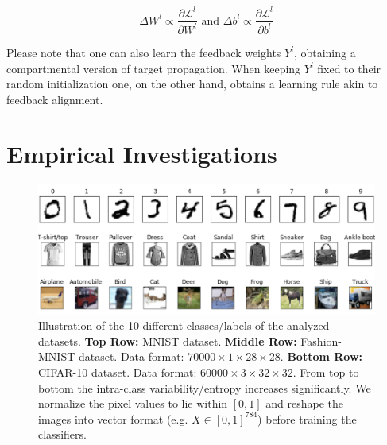 \documentclass[colorinlistoftodos]{article}
\theoremstyle{definition}
\begin{document}
$$\Delta W^l \propto \frac{\partial \mathcal{L}^l}{\partial W^l} \text{  and  } \Delta b^l \propto \frac{\partial \mathcal{L}^l}{\partial b^l}$$

Please note that one can also learn the feedback weights $Y^l$, obtaining a compartmental version of target propagation. When keeping $Y^l$ fixed to their random initialization one, on the other hand, obtains a learning rule akin to feedback alignment.

\section{Empirical Investigations}

\begin{figure}[H]
	\centering
	\includegraphics[width=\textwidth]{../figures/report/datasets}
	\caption{Illustration of the 10 different classes/labels of the analyzed datasets. \textbf{Top Row:} MNIST dataset. \textbf{Middle Row:} Fashion-MNIST dataset. Data format: $70000 \times 1 \times 28 \times 28$. \textbf{Bottom Row:} CIFAR-10 dataset. Data format: $60000 \times 3 \times 32 \times 32$. From top to bottom the intra-class variability/entropy increases significantly. We normalize the pixel values to lie within $[0, 1]$ and reshape the images into vector format (e.g. $X \in [0, 1]^{784}$) before training the classifiers.}	\label{fig:data}
\end{figure}
\end{document}
